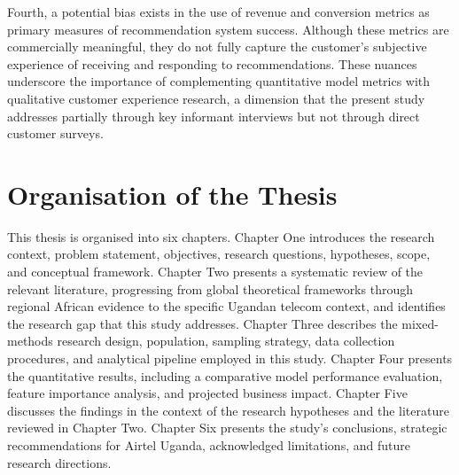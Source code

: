 Fourth, a potential bias exists in the use of revenue and conversion metrics as primary measures of recommendation system success. Although these metrics are commercially meaningful, they do not fully capture the customer's subjective experience of receiving and responding to recommendations. These nuances underscore the importance of complementing quantitative model metrics with qualitative customer experience research, a dimension that the present study addresses partially through key informant interviews but not through direct customer surveys.


\section{Organisation of the Thesis}

This thesis is organised into six chapters. Chapter One introduces the research context, problem statement, objectives, research questions, hypotheses, scope, and conceptual framework. Chapter Two presents a systematic review of the relevant literature, progressing from global theoretical frameworks through regional African evidence to the specific Ugandan telecom context, and identifies the research gap that this study addresses. Chapter Three describes the mixed-methods research design, population, sampling strategy, data collection procedures, and analytical pipeline employed in this study. Chapter Four presents the quantitative results, including a comparative model performance evaluation, feature importance analysis, and projected business impact. Chapter Five discusses the findings in the context of the research hypotheses and the literature reviewed in Chapter Two. Chapter Six presents the study's conclusions, strategic recommendations for Airtel Uganda, acknowledged limitations, and future research directions.
